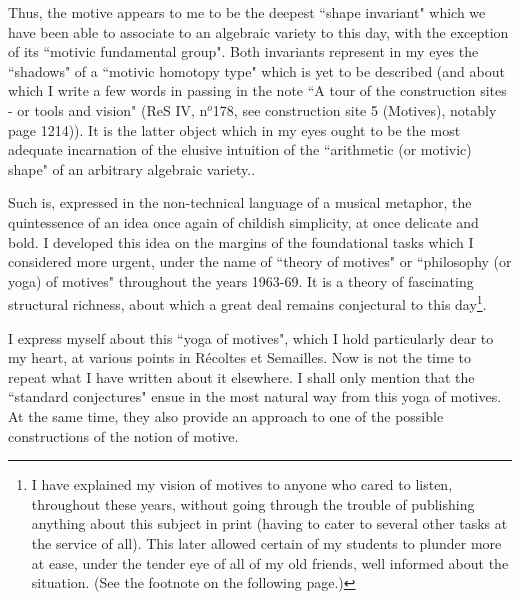 {Thus, the motive appears to me to be the deepest ``shape invariant" which we have been able to associate to an algebraic variety to this day, with the exception of its ``motivic fundamental group". Both invariants represent in my eyes the ``shadows" of a ``motivic homotopy type" which is yet to be described (and about which I write a few words in passing in the note ``A tour of the construction sites - or tools and vision" (ReS IV, n$^o$178, see construction site 5 (Motives), notably page 1214)). It is the latter object which in my eyes ought to be the most adequate incarnation of the elusive intuition of the ``arithmetic (or motivic) shape" of an arbitrary algebraic variety.}.

Such is, expressed in the non-technical language of a musical metaphor, the quintessence of an idea once again of childish simplicity, at once delicate and bold. I developed this idea on the margins of the foundational tasks which I considered more urgent, under the name of ``theory of motives" or ``philosophy (or yoga) of motives" throughout the years 1963-69. It is a theory of fascinating structural richness, about which a great deal remains conjectural to this day\footnote{I have explained my vision of motives to anyone who cared to listen, throughout these years, without going through the trouble of publishing anything about this subject in print (having to cater to several other tasks at the service of all). This later allowed certain of my students to plunder more at ease, under the tender eye of all of my old friends, well informed about the situation. (See the footnote on the following page.)}.

I express myself about this ``yoga of motives", which I hold particularly dear to my heart, at various points in R\'ecoltes et Semailles. Now is not the time to repeat what I have written about it elsewhere. I shall only mention that the ``standard conjectures" ensue in the most natural way from this yoga of motives. At the same time, they also provide an approach to one of the possible constructions of the notion of motive.

